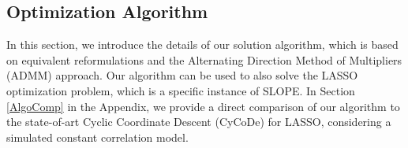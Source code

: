 \documentclass[12pt, a4paper]{article}
\newcommand{\red}[1]{{\color{red} #1}}
\begin{document}
\subsection{Optimization Algorithm} %

In this section, we introduce the details of our solution algorithm,
which is based on equivalent reformulations and the Alternating
Direction Method of Multipliers (ADMM)
approach. %
Our algorithm can be used to also solve the LASSO optimization problem, which is a specific instance of SLOPE. In Section \ref{AlgoComp} in the Appendix, we provide a direct comparison of our algorithm to the state-of-art
Cyclic Coordinate Descent (CyCoDe) for LASSO, considering a simulated constant
correlation model.

\end{document}
